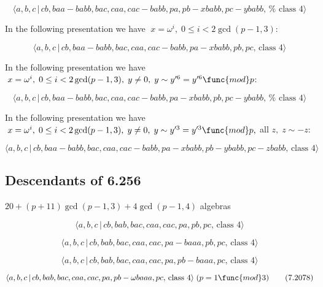 \documentclass[10pt]{article}
\begin{document}
\begin{equation}
\langle a,b,c\,|\,cb,baa-babb,bac,caa,cac-babb,pa,pb-xbabb,pc-ybabb,\,\text{%
class }4\rangle  \tag{7.2071}
\end{equation}

In the following presentation we have $\;x=\omega ^{i},\;0\leq i<2\gcd
(p-1,3)$:

\begin{equation}
\langle a,b,c\,|\,cb,baa-babb,bac,caa,cac-babb,pa-xbabb,pb,pc,\,\text{class }%
4\rangle  \tag{7.2072}
\end{equation}

In the following presentation we have $\;x=\omega ^{i},\;0\leq i<2\gcd
(p-1,3),\;y\neq 0,\;y\sim y^{\prime 6}=y^{\prime 6}\func{mod}p$:

\begin{equation}
\langle a,b,c\,|\,cb,baa-babb,bac,caa,cac-babb,pa-xbabb,pb,pc-ybabb,\,\text{%
class }4\rangle  \tag{7.2073}
\end{equation}

In the following presentation we have $\;x=\omega ^{i},\;0\leq i<2\gcd
(p-1,3),\;y\neq 0,\;y\sim y^{\prime 3}=y^{\prime 3}\func{mod}p,$ all $%
z,\;z\sim -z$:

\begin{equation}
\langle a,b,c\,|\,cb,baa-babb,bac,caa,cac-babb,pa-xbabb,pb-ybabb,pc-zbabb,\,%
\text{class }4\rangle  \tag{7.2074}
\end{equation}

\subsection{Descendants of 6.256}

$20+(p+11)\gcd (p-1,3)+4\gcd (p-1,4)$ algebras

\begin{equation}
\langle a,b,c\,|\,cb,bab,bac,caa,cac,pa,pb,pc,\,\text{class }4\rangle 
\tag{7.2075}
\end{equation}

\begin{equation}
\langle a,b,c\,|\,cb,bab,bac,caa,cac,pa-baaa,pb,pc,\,\text{class }4\rangle 
\tag{7.2076}
\end{equation}

\begin{equation}
\langle a,b,c\,|\,cb,bab,bac,caa,cac,pa,pb-baaa,pc,\,\text{class }4\rangle 
\tag{7.2077}
\end{equation}

\begin{equation}
\langle a,b,c\,|\,cb,bab,bac,caa,cac,pa,pb-\omega baaa,pc,\,\text{class }%
4\rangle \;(p=1\func{mod}3)  \tag{7.2078}
\end{equation}
\end{document}
